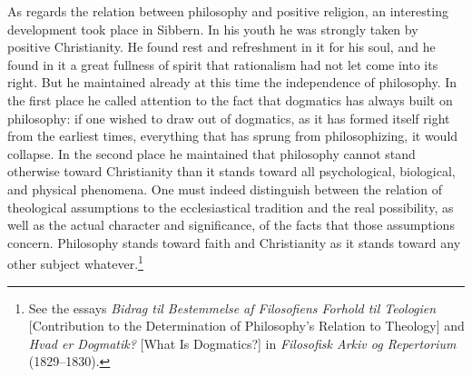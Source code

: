 \documentclass[12pt,a4paper]{book}
\begin{document}
As regards the relation between philosophy and positive religion, an interesting development
took place in Sibbern. In his youth he was strongly taken by positive Christianity. He found
rest and refreshment in it for his soul, and he found in it a great fullness of spirit that
rationalism had not let come into its right. But he maintained already at this time the
independence of philosophy. In the first place he called attention to the fact that
dogmatics has always built on philosophy: if one wished to draw out of dogmatics, as it has
formed itself right from the earliest times, everything that has sprung from philosophizing,
it would collapse. In the second place he maintained that philosophy cannot stand otherwise
toward Christianity than it stands toward all psychological, biological, and physical
phenomena. One must indeed distinguish between the relation of theological assumptions to the
ecclesiastical tradition and the real possibility, as well as the actual character and
significance, of the facts that those assumptions concern. Philosophy stands toward faith and
Christianity as it stands toward any other subject whatever.\footnote{See the essays
\emph{Bidrag til Bestemmelse af Filosofiens Forhold til Teologien} [Contribution to the
Determination of Philosophy's Relation to Theology] and \emph{Hvad er Dogmatik?} [What Is
Dogmatics?] in \emph{Filosofisk Arkiv og Repertorium} (1829--1830).}
\end{document}
